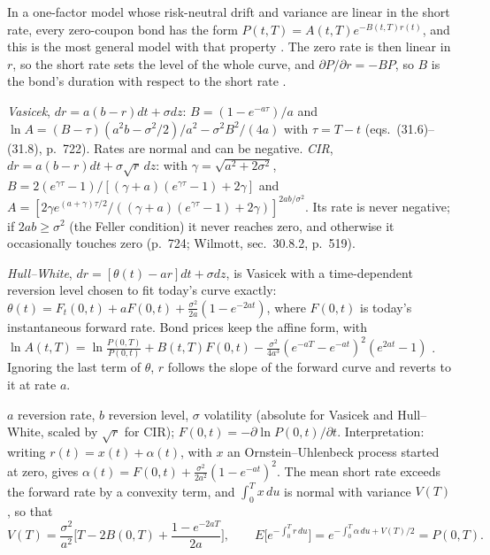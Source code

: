 \begin{qfmodel}\label{mod:affine-short-rate-models}
 In a one-factor model whose risk-neutral drift and variance are linear in the short rate, every zero-coupon bond has the form $P(t,T)=A(t,T)e^{-B(t,T)r(t)}$, and this is the most general model with that property \citep[chap.~30, secs.~30.6--30.7, pp.~515--516]{wide-wilmott-pwoqf}. The zero rate is then linear in $r$, so the short rate sets the level of the whole curve, and $\partial P/\partial r=-BP$, so $B$ is the bond's duration with respect to the short rate \citep[chap.~31, sec.~31.2, pp.~723--725, eqs.~(31.9)--(31.10)]{s7-hulloptions}.

\emph{Vasicek}, $dr=a(b-r)dt+\sigma dz$: $B=(1-e^{-a\tau})/a$ and $\ln A=(B-\tau)(a^2b-\sigma^2/2)/a^2-\sigma^2B^2/(4a)$ with $\tau=T-t$ (eqs.~(31.6)--(31.8), p.~722). Rates are normal and can be negative. \emph{CIR}, $dr=a(b-r)dt+\sigma\sqrt r\,dz$: with $\gamma=\sqrt{a^2+2\sigma^2}$, $B=2(e^{\gamma\tau}-1)/[(\gamma+a)(e^{\gamma\tau}-1)+2\gamma]$ and $A=[2\gamma e^{(a+\gamma)\tau/2}/((\gamma+a)(e^{\gamma\tau}-1)+2\gamma)]^{2ab/\sigma^2}$. Its rate is never negative; if $2ab\ge\sigma^2$ (the Feller condition) it never reaches zero, and otherwise it occasionally touches zero (p.~724; Wilmott, sec.~30.8.2, p.~519).

\emph{Hull--White}, $dr=[\theta(t)-ar]dt+\sigma dz$, is Vasicek with a time-dependent reversion level chosen to fit today's curve exactly: $\theta(t)=F_t(0,t)+aF(0,t)+\tfrac{\sigma^2}{2a}(1-e^{-2at})$, where $F(0,t)$ is today's instantaneous forward rate. Bond prices keep the affine form, with $\ln A(t,T)=\ln\frac{P(0,T)}{P(0,t)}+B(t,T)F(0,t)-\tfrac{\sigma^2}{4a^3}(e^{-aT}-e^{-at})^2(e^{2at}-1)$ \citep[chap.~32, sec.~32.1, pp.~734--735, eqs.~(32.5)--(32.8)]{s7-hulloptions}. Ignoring the last term of $\theta$, $r$ follows the slope of the forward curve and reverts to it at rate $a$.

 $a$ reversion rate, $b$ reversion level, $\sigma$ volatility (absolute for Vasicek and Hull--White, scaled by $\sqrt r$ for CIR); $F(0,t)=-\partial\ln P(0,t)/\partial t$. Interpretation: writing $r(t)=x(t)+\alpha(t)$, with $x$ an Ornstein--Uhlenbeck process started at zero, gives $\alpha(t)=F(0,t)+\tfrac{\sigma^2}{2a^2}(1-e^{-at})^2$. The mean short rate exceeds the forward rate by a convexity term, and $\int_0^Tx\,du$ is normal with variance $V(T)$, so that
\[ V(T)=\frac{\sigma^2}{a^2}\Big[T-2B(0,T)+\frac{1-e^{-2aT}}{2a}\Big],\qquad E\big[e^{-\int_0^Tr\,du}\big]=e^{-\int_0^T\alpha\,du+V(T)/2}=P(0,T). \]


\end{qfmodel}
